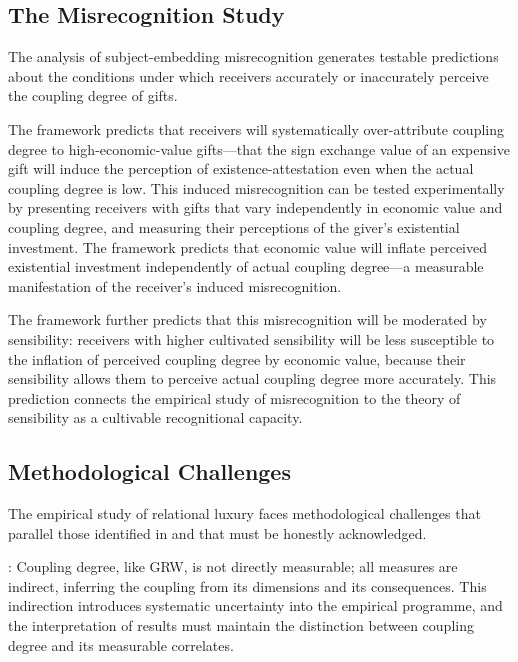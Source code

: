 \subsection{The Misrecognition Study}
\label{p16:subsec:misrecognition_study}

\noindent
The analysis of subject-embedding misrecognition generates testable predictions about the conditions under which receivers accurately or inaccurately perceive the coupling degree of gifts.

The framework predicts that receivers will systematically over-attribute coupling degree to high-economic-value gifts---that the sign exchange value of an expensive gift will induce the perception of existence-attestation even when the actual coupling degree is low. This induced misrecognition can be tested experimentally by presenting receivers with gifts that vary independently in economic value and coupling degree, and measuring their perceptions of the giver's existential investment. The framework predicts that economic value will inflate perceived existential investment independently of actual coupling degree---a measurable manifestation of the receiver's induced misrecognition.

The framework further predicts that this misrecognition will be moderated by sensibility: receivers with higher cultivated sensibility will be less susceptible to the inflation of perceived coupling degree by economic value, because their sensibility allows them to perceive actual coupling degree more accurately. This prediction connects the empirical study of misrecognition to the theory of sensibility as a cultivable recognitional capacity.

\subsection{Methodological Challenges}
\label{p16:subsec:methodological_challenges}

\noindent
The empirical study of relational luxury faces methodological challenges that parallel those identified in  \parencite{paperxv} and that must be honestly acknowledged.

: Coupling degree, like GRW, is not directly measurable; all measures are indirect, inferring the coupling from its dimensions and its consequences. This indirection introduces systematic uncertainty into the empirical programme, and the interpretation of results must maintain the distinction between coupling degree and its measurable correlates.

